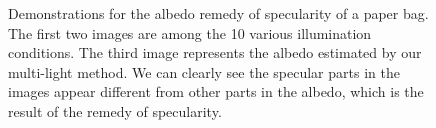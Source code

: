 \begin{figure}[!ht]
\centering
{}
\caption{Demonstrations for the albedo remedy of specularity of a paper bag. The first two images are among the 10 various illumination conditions. The third image represents the albedo estimated by our multi-light method. We can clearly see the specular parts in the images appear different from other parts in the albedo, which is the result of the remedy of specularity.}
\label{fig:specular_illu}
\end{figure}


